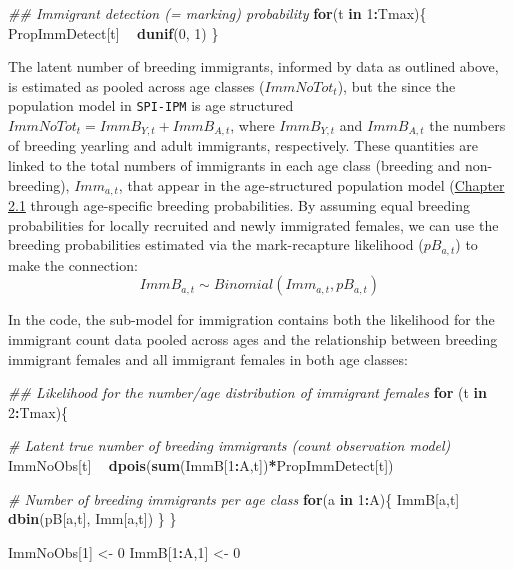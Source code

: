 \documentclass[
]{book}
\newenvironment{Shaded}{\begin{snugshade}}{\end{snugshade}}
\newcommand{\CommentTok}[1]{\textcolor[rgb]{0.56,0.35,0.01}{\textit{#1}}}
\newcommand{\ControlFlowTok}[1]{\textcolor[rgb]{0.13,0.29,0.53}{\textbf{#1}}}
\newcommand{\DecValTok}[1]{\textcolor[rgb]{0.00,0.00,0.81}{#1}}
\newcommand{\KeywordTok}[1]{\textcolor[rgb]{0.13,0.29,0.53}{\textbf{#1}}}
\newcommand{\NormalTok}[1]{#1}
\newcommand{\OperatorTok}[1]{\textcolor[rgb]{0.81,0.36,0.00}{\textbf{#1}}}
\newcommand{\StringTok}[1]{\textcolor[rgb]{0.31,0.60,0.02}{#1}}
\begin{document}
\begin{Shaded}
\begin{Highlighting}[]
\CommentTok{## Immigrant detection (= marking) probability}
  \ControlFlowTok{for}\NormalTok{(t }\ControlFlowTok{in} \DecValTok{1}\OperatorTok{:}\NormalTok{Tmax)\{}
\NormalTok{    PropImmDetect[t] }\OperatorTok{~}\StringTok{ }\KeywordTok{dunif}\NormalTok{(}\DecValTok{0}\NormalTok{, }\DecValTok{1}\NormalTok{)}
\NormalTok{  \}}
\end{Highlighting}
\end{Shaded}

The latent number of breeding immigrants, informed by data as outlined above, is estimated as pooled across age classes (\(ImmNoTot_t\)), but the since the population model in \texttt{SPI-IPM} is age structured \(ImmNoTot_t = ImmB_{Y,t} +ImmB_{A,t}\), where \(ImmB_{Y,t}\) and \(ImmB_{A,t}\) the numbers of breeding yearling and adult immigrants, respectively. These quantities are linked to the total numbers of immigrants in each age class (breeding and non-breeding), \(Imm_{a,t}\), that appear in the age-structured population model (\protect\hyperlink{ux5cux23ux5cux2520Openux5cux2520populationux5cux2520modelux5cux2520withux5cux25202ux5cux2520ageux5cux2520classes}{Chapter 2.1} through age-specific breeding probabilities.
By assuming equal breeding probabilities for locally recruited and newly immigrated females, we can use the breeding probabilities estimated via the mark-recapture likelihood (\(pB_{a,t}\)) to make the connection:
\begin{equation}
  ImmB_{a,t} \sim Binomial(Imm_{a,t}, pB_{a,t})
\end{equation}

In the code, the sub-model for immigration contains both the likelihood for the immigrant count data pooled across ages and the relationship between breeding immigrant females and all immigrant females in both age classes:

\begin{Shaded}
\begin{Highlighting}[]
\CommentTok{## Likelihood for the number/age distribution of immigrant females}
\ControlFlowTok{for}\NormalTok{ (t }\ControlFlowTok{in} \DecValTok{2}\OperatorTok{:}\NormalTok{Tmax)\{}

  \CommentTok{# Latent true number of breeding immigrants (count observation model)}
\NormalTok{  ImmNoObs[t] }\OperatorTok{~}\StringTok{ }\KeywordTok{dpois}\NormalTok{(}\KeywordTok{sum}\NormalTok{(ImmB[}\DecValTok{1}\OperatorTok{:}\NormalTok{A,t])}\OperatorTok{*}\NormalTok{PropImmDetect[t])}

  \CommentTok{# Number of breeding immigrants per age class}
  \ControlFlowTok{for}\NormalTok{(a }\ControlFlowTok{in} \DecValTok{1}\OperatorTok{:}\NormalTok{A)\{}
\NormalTok{    ImmB[a,t] }\OperatorTok{~}\StringTok{ }\KeywordTok{dbin}\NormalTok{(pB[a,t], Imm[a,t])}
\NormalTok{  \}}
\NormalTok{\}}

\NormalTok{ImmNoObs[}\DecValTok{1}\NormalTok{] <-}\StringTok{ }\DecValTok{0}
\NormalTok{ImmB[}\DecValTok{1}\OperatorTok{:}\NormalTok{A,}\DecValTok{1}\NormalTok{] <-}\StringTok{ }\DecValTok{0}
\end{Highlighting}
\end{Shaded}
\end{document}
